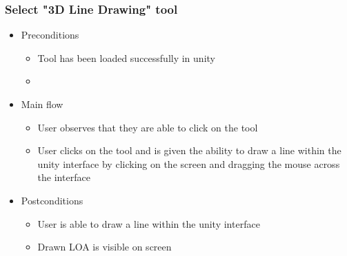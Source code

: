 \subsubsection{Select "3D Line Drawing" tool}
    \begin{itemize}
    \item Preconditions
        \begin{itemize}
            \item Tool has been loaded successfully in unity
            \item
        \end{itemize}
    \end{itemize}
    \begin{itemize}
        \item Main flow
        \begin{itemize}
            \item User observes that they are able to click on the tool
            \item User clicks on the tool and is given the ability to draw a line within the unity interface by clicking on the screen and dragging the mouse across the interface
        \end{itemize}
    \end{itemize}
    \begin{itemize}
        \item Postconditions
        \begin{itemize}
            \item User is able to draw a line within the unity interface
            \item Drawn LOA is visible on screen
        \end{itemize}
    \end{itemize}

